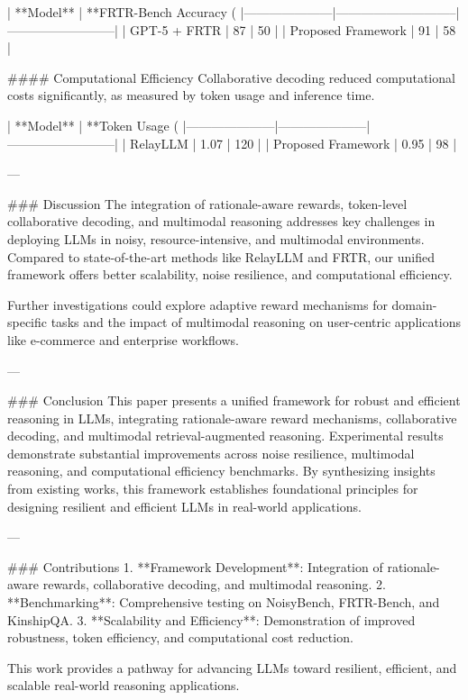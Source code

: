 | **Model**          | **FRTR-Bench Accuracy (%
|---------------------|-----------------------------|--------------------------|  
| GPT-5 + FRTR       | 87                          | 50                       |  
| Proposed Framework  | 91                          | 58                       |  

#### Computational Efficiency  
Collaborative decoding reduced computational costs significantly, as measured by token usage and inference time.  

| **Model**          | **Token Usage (%
|---------------------|---------------------|--------------------------|  
| RelayLLM           | 1.07                | 120                      |  
| Proposed Framework  | 0.95                | 98                       |  

---

### Discussion  
The integration of rationale-aware rewards, token-level collaborative decoding, and multimodal reasoning addresses key challenges in deploying LLMs in noisy, resource-intensive, and multimodal environments. Compared to state-of-the-art methods like RelayLLM and FRTR, our unified framework offers better scalability, noise resilience, and computational efficiency.  

Further investigations could explore adaptive reward mechanisms for domain-specific tasks and the impact of multimodal reasoning on user-centric applications like e-commerce and enterprise workflows.  

---

### Conclusion  
This paper presents a unified framework for robust and efficient reasoning in LLMs, integrating rationale-aware reward mechanisms, collaborative decoding, and multimodal retrieval-augmented reasoning. Experimental results demonstrate substantial improvements across noise resilience, multimodal reasoning, and computational efficiency benchmarks. By synthesizing insights from existing works, this framework establishes foundational principles for designing resilient and efficient LLMs in real-world applications.  

---

### Contributions  
1. **Framework Development**: Integration of rationale-aware rewards, collaborative decoding, and multimodal reasoning.  
2. **Benchmarking**: Comprehensive testing on NoisyBench, FRTR-Bench, and KinshipQA.  
3. **Scalability and Efficiency**: Demonstration of improved robustness, token efficiency, and computational cost reduction.  

This work provides a pathway for advancing LLMs toward resilient, efficient, and scalable real-world reasoning applications.  